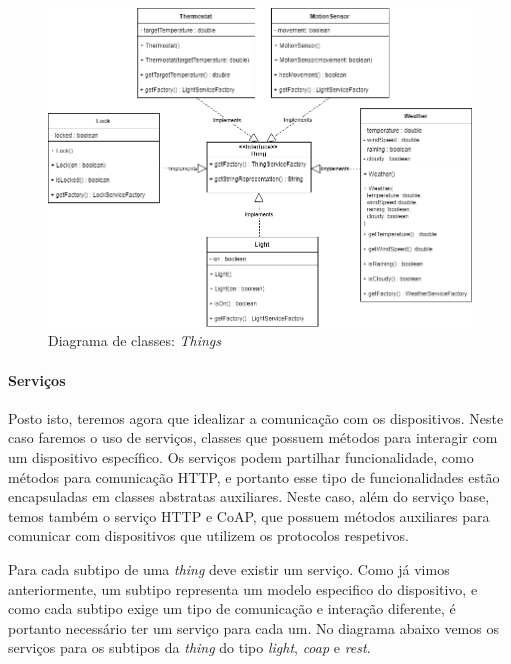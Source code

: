 \begin{figure}[H]
  \centering
        \includegraphics[scale=0.55]{img/hub-things.png}
  \caption{Diagrama de classes: \textit{Things}}
  \label{fig:things-hub}
\end{figure}

%
%
%
%

\paragraph*{Serviços}

Posto isto, teremos agora que idealizar a comunicação com os dispositivos. Neste caso faremos o uso de serviços, classes que possuem métodos para interagir com um dispositivo específico. Os serviços podem partilhar funcionalidade, como métodos para comunicação HTTP, e portanto esse tipo de funcionalidades estão encapsuladas em classes abstratas auxiliares. Neste caso, além do serviço base, temos também o serviço HTTP e CoAP, que possuem métodos auxiliares para comunicar com dispositivos que utilizem os protocolos respetivos.

Para cada subtipo de uma \textit{thing} deve existir um serviço. Como já vimos anteriormente, um subtipo representa um modelo especifico do dispositivo, e como cada subtipo exige um tipo de comunicação e interação diferente, é portanto necessário ter um serviço para cada um. No diagrama abaixo vemos os serviços para os subtipos da \textit{thing} do tipo \textit{light}, \textit{coap} e \textit{rest}.

